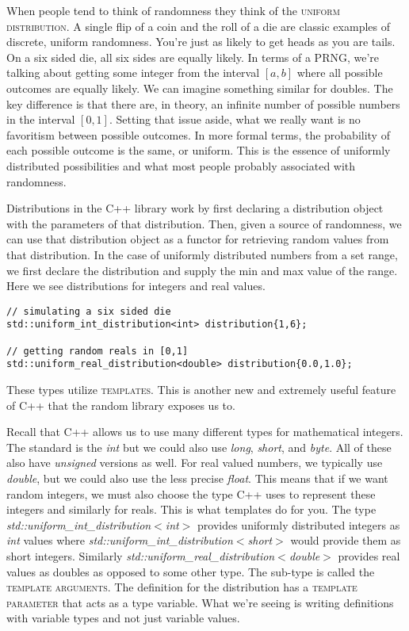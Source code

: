 \documentclass[]{tufte-handout}
\begin{document}
When people tend to think of randomness they think of the \textsc{uniform distribution}. A single flip of a coin and the roll of a die are classic examples of discrete, uniform randomness. You're just as likely to get heads as you are tails. On a six sided die, all six sides are equally likely. In terms of a PRNG, we're talking about getting some integer from the interval $[a,b]$ where all possible outcomes are equally likely. We can imagine something similar for doubles.  The key difference is that there are, in theory, an infinite number of possible numbers in the interval $[0,1]$.  Setting that issue aside, what we really want is no favoritism between possible outcomes. In more formal terms, the probability of each possible outcome is the same, or uniform.  This is the essence of uniformly distributed possibilities and what most people probably associated with randomness. 

Distributions in the C++ library work by first declaring a distribution object with the parameters of that distribution. Then, given a source of randomness, we can use that distribution object as a functor for retrieving random values from that distribution. In the case of uniformly distributed numbers from a set range, we first declare the distribution and supply the min and max value of the range. Here we see distributions for integers and real values. 
\begin{verbatim}
// simulating a six sided die 
std::uniform_int_distribution<int> distribution{1,6};

// getting random reals in [0,1]
std::uniform_real_distribution<double> distribution{0.0,1.0};
\end{verbatim}
These types utilize \textsc{templates}.  This is another new and extremely useful feature of C++ that the random library exposes us to. 

Recall that C++ allows us to use many different types for mathematical integers. The standard is the \textit{int} but we could also use \textit{long}, \textit{short}, and \textit{byte}.  All of these also have \textit{unsigned} versions as well. For real valued numbers, we typically use \textit{double}, but we could also use the less precise \textit{float}.  This means that if we want random integers, we must also choose the type C++ uses to represent these integers and similarly for reals. This is what templates do for you. The type \textit{std::uniform\_int\_distribution$<$int$>$} provides uniformly distributed integers as \textit{int} values where \textit{std::uniform\_int\_distribution$<$short$>$} would provide them as short integers. Similarly \textit{std::uniform\_real\_distribution$<$double$>$} provides real values as doubles as opposed to some other type. The sub-type is called the \textsc{template arguments}. The definition for the distribution has a \textsc{template parameter} that acts as a type variable. What we're seeing is writing definitions with variable types and not just variable values. 
\end{document}
